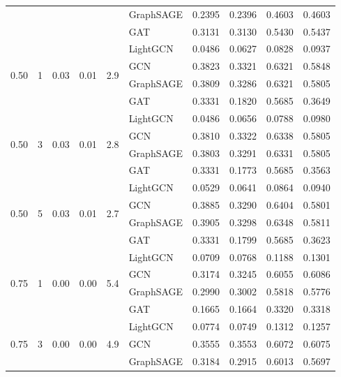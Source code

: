 {\begin{longtable}{cccccl rrrr}
 & & & & & GraphSAGE & 0.2395 & 0.2396 & 0.4603 & 0.4603 \\
 & & & & & GAT & 0.3131 & 0.3130 & 0.5430 & 0.5437 \\
\midrule
\multirow{4}{*}{0.50} & \multirow{4}{*}{1} & \multirow{4}{*}{0.03} & \multirow{4}{*}{0.01} & \multirow{4}{*}{2.9} & LightGCN & 0.0486 & 0.0627 & 0.0828 & 0.0937 \\
 & & & & & GCN & 0.3823 & 0.3321 & 0.6321 & 0.5848 \\
 & & & & & GraphSAGE & 0.3809 & 0.3286 & 0.6321 & 0.5805 \\
 & & & & & GAT & 0.3331 & 0.1820 & 0.5685 & 0.3649 \\
\midrule
\multirow{4}{*}{0.50} & \multirow{4}{*}{3} & \multirow{4}{*}{0.03} & \multirow{4}{*}{0.01} & \multirow{4}{*}{2.8} & LightGCN & 0.0486 & 0.0656 & 0.0788 & 0.0980 \\
 & & & & & GCN & 0.3810 & 0.3322 & 0.6338 & 0.5805 \\
 & & & & & GraphSAGE & 0.3803 & 0.3291 & 0.6331 & 0.5805 \\
 & & & & & GAT & 0.3331 & 0.1773 & 0.5685 & 0.3563 \\
\midrule
\multirow{4}{*}{0.50} & \multirow{4}{*}{5} & \multirow{4}{*}{0.03} & \multirow{4}{*}{0.01} & \multirow{4}{*}{2.7} & LightGCN & 0.0529 & 0.0641 & 0.0864 & 0.0940 \\
 & & & & & GCN & 0.3885 & 0.3290 & 0.6404 & 0.5801 \\
 & & & & & GraphSAGE & 0.3905 & 0.3298 & 0.6348 & 0.5811 \\
 & & & & & GAT & 0.3331 & 0.1799 & 0.5685 & 0.3623 \\
\midrule
\multirow{4}{*}{0.75} & \multirow{4}{*}{1} & \multirow{4}{*}{0.00} & \multirow{4}{*}{0.00} & \multirow{4}{*}{5.4} & LightGCN & 0.0709 & 0.0768 & 0.1188 & 0.1301 \\
 & & & & & GCN & 0.3174 & 0.3245 & 0.6055 & 0.6086 \\
 & & & & & GraphSAGE & 0.2990 & 0.3002 & 0.5818 & 0.5776 \\
 & & & & & GAT & 0.1665 & 0.1664 & 0.3320 & 0.3318 \\
\midrule
\multirow{4}{*}{0.75} & \multirow{4}{*}{3} & \multirow{4}{*}{0.00} & \multirow{4}{*}{0.00} & \multirow{4}{*}{4.9} & LightGCN & 0.0774 & 0.0749 & 0.1312 & 0.1257 \\
 & & & & & GCN & 0.3555 & 0.3553 & 0.6072 & 0.6075 \\
 & & & & & GraphSAGE & 0.3184 & 0.2915 & 0.6013 & 0.5697 \\

\end{longtable}}
